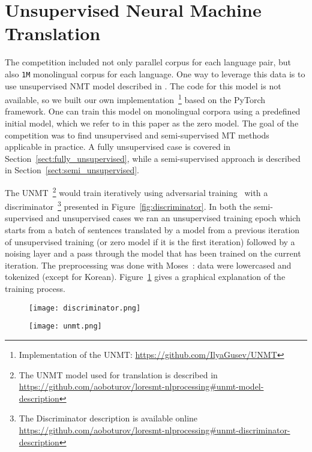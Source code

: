 \documentclass[]{article}
\begin{document}
\section{Unsupervised Neural Machine Translation}
\label{sect:unmt}

The competition included not only parallel corpus for each language pair, but also {\tt 1M} monolingual corpus for each language.
One way to leverage this data is to use unsupervised \ac{NMT} model described in \cite{DBLP:journals/corr/abs-1711-00043}.
The code for this model is not available, so we built our own implementation~\footnote{Implementation of the \acs{UNMT}: \url{https://github.com/IlyaGusev/UNMT}} based on the PyTorch~\citep{paszke2017automatic} framework.
One can train this model on monolingual corpora using a predefined initial model, which we refer to in this paper as the zero model.
The goal of the competition was to find unsupervised and semi-supervised \ac{MT} methods applicable in practice.
A fully unsupervised case is covered in Section~\ref{sect:fully_unsupervised}, while a semi-supervised approach is described in Section~\ref{sect:semi_unsupervised}.

The \ac{UNMT}~\footnote{The \ac{UNMT} model used for translation is described in \url{https://github.com/aoboturov/loresmt-nlprocessing\#unmt-model-description}} would train iteratively using adversarial training~\citep{goodfellow2016nips} with a discriminator~\footnote{The Discriminator description is available online \url{https://github.com/aoboturov/loresmt-nlprocessing\#unmt-discriminator-description}} presented in Figure~\ref{fig:discriminator}.
In both the semi-supervised and unsupervised cases we ran an unsupervised training epoch which starts from a batch of sentences translated by a model from a previous iteration of unsupervised training (or zero model if it is the first iteration) followed by a noising layer and a pass through the model that has been trained on the current iteration.
The preprocessing was done with Moses~\citep{koehn2007moses}: data were lowercased and tokenized (except for Korean).
Figure~\ref{fig:unsupervised_training} gives a graphical explanation of the training process.

\begin{figure}
\centering
\begin{minipage}{.4\textwidth}
  \centering
  \texttt{[image: discriminator.png]}
  \label{fig:discriminator}
\end{minipage}\hfill
\begin{minipage}{.6\textwidth}
  \centering
  \texttt{[image: unmt.png]}
  \label{fig:unsupervised_training}
\end{minipage}
\end{figure}
\end{document}

